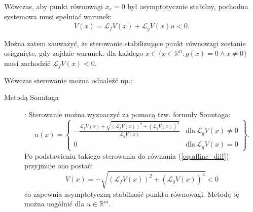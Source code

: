 \documentclass{article}
\begin{document}
    Wówczas, aby punkt równowagi $x_{e} = 0$ był asymptotycznie stabilny, pochodna systemowa musi spełniać warunek:
    \begin{equation} \label{eq:affine_diff}
        \dot{V}(x) = \mathcal{L}_{f}V(x) + \mathcal{L}_{g}V(x)u < 0.
    \end{equation}
    
    Można zatem zauważyć, że sterowanie stabilizujące punkt równowagi zostanie osiągnięte, gdy zajdzie warunek: dla każdego $x \in \{ x \in \mathbb{R}^{n}: g(x) = 0 \land x \neq 0 \}$ musi zachodzić $\mathcal{L}_{f}V(x) < 0$.

    Wówczas sterowanie można odnaleźć np.:
    \begin{description}
        \item[Metodą Sonntaga]:
        Sterowanie można wyznaczyć za pomocą tzw. formuły Sonntaga:
        $$
            u(x)
            =
            \left\{
            \begin{array}{cl}
                 -\frac{\mathcal{L}_{f}V(x) + \sqrt{(\mathcal{L}_{f}V(x))^{2} + (\mathcal{L}_{g}V(x))^{4}}}{\mathcal{L}_{g}V(x)} &   \text{dla}\, \mathcal{L}_{g}V(x) \neq 0\\
                 0  &   \text{dla}\, \mathcal{L}_{g}V(x) = 0
            \end{array}
            \right\}.
        $$
        Po podstawieniu takiego sterowania do równania (\ref{eq:affine_diff}) przyjmuje ono postać:
        $$
            \dot{V}(x) = - \sqrt{(\mathcal{L}_{f}V(x))^{2} + (\mathcal{L}_{g}V(x))^{4}} < 0
        $$
        co zapewnia asymptotyczną stabilność punktu równowagi.
        Metodę tę można uogólnić dla $u \in \mathbb{R}^{m}$.


\end{description}
\end{document}
